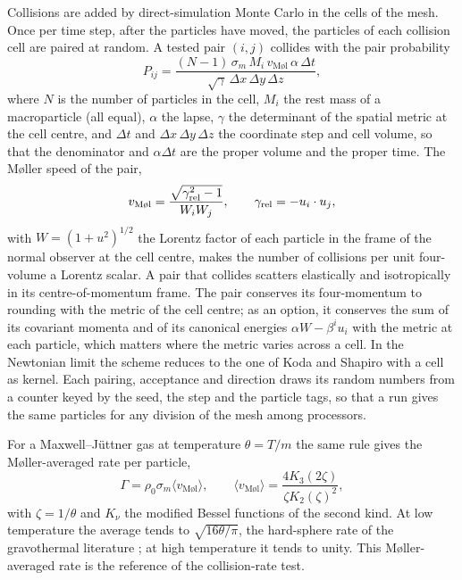 \documentclass[aps,prd,twocolumn,10pt,superscriptaddress,nofootinbib,longbibliography,floatfix]{revtex4-2}
\newcommand{\vM}{v_{\text{M\o l}}}
\newcommand{\sigmam}{\sigma_m}
\begin{document}
Collisions are added by direct-simulation Monte Carlo in the cells of the mesh. Once per time step, after the particles have moved, the particles of each collision cell are paired at random. A tested pair $(i,j)$ collides with the pair probability
\begin{equation}\label{eq:pairprob}
P_{ij}=\frac{(N-1)\,\sigmam\,M_i\,\vM\,\alpha\,\Delta t}{\sqrt{\gamma}\,\Delta x\,\Delta y\,\Delta z},
\end{equation}
where $N$ is the number of particles in the cell, $M_i$ the rest mass of a macroparticle (all equal), $\alpha$ the lapse, $\gamma$ the determinant of the spatial metric at the cell centre, and $\Delta t$ and $\Delta x\,\Delta y\,\Delta z$ the coordinate step and cell volume, so that the denominator and $\alpha\Delta t$ are the proper volume and the proper time. The M\o ller speed of the pair,
\begin{equation}\label{eq:moller}
\vM=\frac{\sqrt{\gamma_{\rm rel}^2-1}}{W_iW_j},\qquad \gamma_{\rm rel}=-u_i\cdot u_j,
\end{equation}
with $W=(1+u^2)^{1/2}$ the Lorentz factor of each particle in the frame of the normal observer at the cell centre, makes the number of collisions per unit four-volume a Lorentz scalar. A pair that collides scatters elastically and isotropically in its centre-of-momentum frame. The pair conserves its four-momentum to rounding with the metric of the cell centre; as an option, it conserves the sum of its covariant momenta and of its canonical energies $\alpha W-\beta^iu_i$ with the metric at each particle, which matters where the metric varies across a cell. In the Newtonian limit the scheme reduces to the one of Koda and Shapiro \cite{Koda:2011sidm} with a cell as kernel. Each pairing, acceptance and direction draws its random numbers from a counter keyed by the seed, the step and the particle tags, so that a run gives the same particles for any division of the mesh among processors.

For a Maxwell--J\"uttner gas at temperature $\theta=T/m$ the same rule gives the M\o ller-averaged rate per particle,
\begin{equation}\label{eq:rate}
\Gamma=\rho_0\sigmam\langle\vM\rangle,\qquad \langle\vM\rangle=\frac{4K_3(2\zeta)}{\zeta K_2(\zeta)^2},
\end{equation}
with $\zeta=1/\theta$ and $K_\nu$ the modified Bessel functions of the second kind. At low temperature the average tends to $\sqrt{16\theta/\pi}$, the hard-sphere rate of the gravothermal literature \cite{Balberg:2002gt}; at high temperature it tends to unity. This M\o ller-averaged rate is the reference of the collision-rate test.
\end{document}
